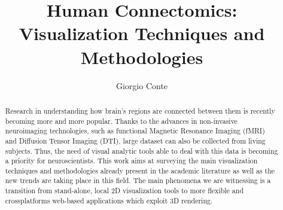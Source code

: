 \documentclass{article}
\title{Human Connectomics: Visualization Techniques and Methodologies}
\author{Giorgio Conte}
\affil{Creative Coding Research Group\\ Department of Computer Science\\University of Illinois at Chicago}
\begin{document}
\maketitle
\begin{abstract}
Research in understanding how brain's regions are connected between them is recently becoming more and more popular. Thanks to the advances in non-invasive neuroimaging technologies, such as functional Magnetic Resonance Imaging (fMRI) and Diffusion Tensor Imaging (DTI), large dataset can also be collected from living subjects. Thus, the need of visual analytic tools able to deal with this data is becoming a priority for neuroscientists. This work aims at surveying the main visualization techniques and methodologies already present in the academic literature as well as the new trends are taking place in this field. The main phenomena we are witnessing is a transition from stand-alone, local 2D visualization tools to more flexible and crossplatforms web-based applications which exploit 3D rendering.
\end{abstract}
\end{document}
